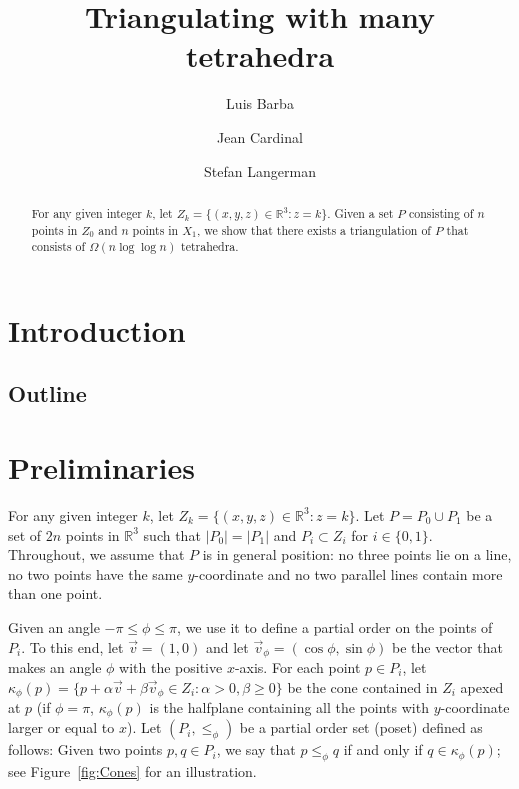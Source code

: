 \documentclass[a4paper, 11pt]{article}
\newcommand{\ve}{{\ensuremath{\vec{v}}}}
\begin{document}
\title{Triangulating with many tetrahedra}





\author{Luis Barba \and Jean Cardinal \and Stefan Langerman
}
\date{}

\maketitle
\begin{abstract}
For any given integer $k$, let $Z_k = \{(x,y,z) \in \mathbb{R}^3 : z = k\}$.
Given a set $P$ consisting of $n$ points in $Z_0$ and $n$ points in $X_1$, we show that there exists a triangulation of $P$ that consists of $\Omega(n \log\log n)$ tetrahedra.
\end{abstract}



\section{Introduction}

\subsection{Outline}
\section{Preliminaries}
For any given integer $k$, let $Z_k = \{(x,y,z) \in \mathbb{R}^3 : z = k\}$.
Let $P = P_0\cup P_1$ be a set of $2n$ points in $\mathbb{R}^3$ such that $|P_0|= |P_1|$ and $P_i\subset Z_i$ for $i\in \{0, 1\}$.
Throughout, we assume that $P$ is in general position: 
no three points lie on a line, no two points have the same $y$-coordinate and no two parallel lines contain more than one point. 

Given an angle $-\pi \leq \phi \leq \pi$, we use it to define a partial order on the points of~$P_i$.
To this end, let $\ve = (1,0)$ and let $\ve_\phi =(\cos\phi, \sin\phi)$ be the vector that makes an angle $\phi$ with the positive $x$-axis.
For each point $p\in P_i$, let $\kappa_{\phi}(p) = \{ p  + \alpha \ve + \beta \ve_\phi \in Z_i : \alpha > 0, \beta \geq 0\}$ be the cone contained in $Z_i$ apexed at $p$ (if $\phi = \pi$, $\kappa_{\phi}(p)$ is the halfplane containing all the points with $y$-coordinate larger or equal to $x$). 
Let $(P_i, \leq_\phi)$ be a partial order set (poset) defined as follows:
Given two points $p,q\in P_i$, we say that $p \leq_\phi q$ if and only if $q\in \kappa_{\phi}(p)$; see Figure~\ref{fig:Cones} for an illustration.
\end{document}
